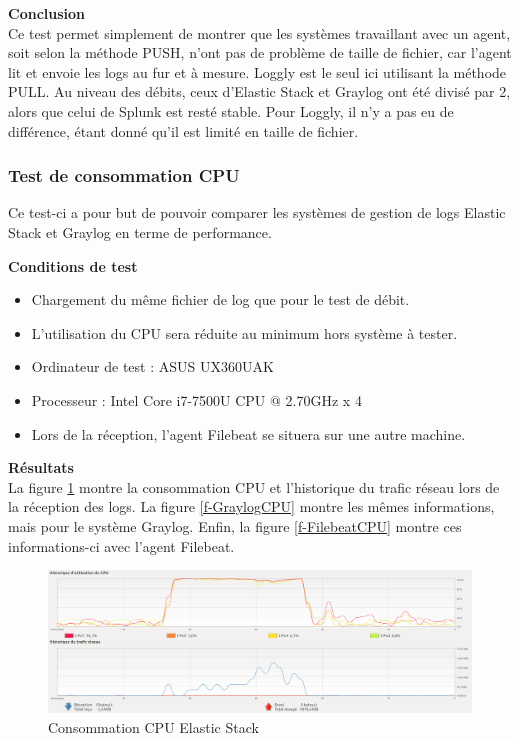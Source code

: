 \documentclass[paper=a4, fontsize=11pt]{scrartcl}
\begin{document}
\textbf{Conclusion} \\
Ce test permet simplement de montrer que les systèmes travaillant avec un agent, soit selon la méthode PUSH, n'ont pas de problème de taille de fichier, car l'agent lit et envoie les logs au fur et à mesure. Loggly est le seul ici utilisant la méthode PULL. Au niveau des débits, ceux d'Elastic Stack et Graylog ont été divisé par 2, alors que celui de Splunk est resté stable. Pour Loggly, il n'y a pas eu de différence, étant donné qu'il est limité en taille de fichier.


\subsubsection{Test de consommation CPU}

Ce test-ci a pour but de pouvoir comparer les systèmes de gestion de logs Elastic Stack et Graylog en terme de performance.

\textbf{Conditions de test} \\
\begin{itemize}
    \item Chargement du même fichier de log que pour le test de débit.
    \item L'utilisation du CPU sera réduite au minimum hors système à tester.
    \item Ordinateur de test : ASUS UX360UAK
    \item Processeur : Intel Core i7-7500U CPU @ 2.70GHz x 4
    \item Lors de la réception, l'agent Filebeat se situera sur une autre machine.
\end{itemize}

\textbf{Résultats} \\
La figure \ref{f-ElasticCPU} montre la consommation CPU et l'historique du trafic réseau lors de la réception des logs. La figure \ref{f-GraylogCPU} montre les mêmes informations, mais pour le système Graylog. Enfin, la figure \ref{f-FilebeatCPU} montre ces informations-ci avec l'agent Filebeat.

\begin{figure}[H]
    \centering
    \includegraphics[width=18cm]{img/screenshots/Elastic_CPU_MEM_Receive_modified.png}
    \caption{Consommation CPU Elastic Stack}
    \label{f-ElasticCPU}
\end{figure}
\end{document}
